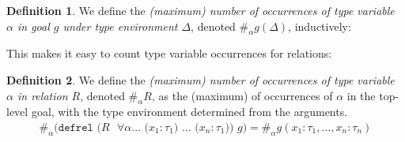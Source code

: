 \documentclass{report}
\theoremstyle{definition}
\newtheorem{definition}{Definition}
\begin{document}
\begin{definition}
	We define the \emph{(maximum) number of occurrences of type variable \(\alpha\) in goal \(g\) under type environment \(\Delta\)}, denoted \(\#_\alpha g(\Delta)\), inductively:
\end{definition}

This makes it easy to count type variable occurrences for relations:

\begin{definition}
	We define the \emph{(maximum) number of occurrences of type variable \(\alpha\) in relation \(R\)}, denoted \(\#_\alpha R\),
	as the (maximum) of occurrences of \(\alpha\) in the top-level goal, with the type environment determined from the arguments.
	\begin{align*}
		\#_\alpha \texttt{(defrel (\(R\) \(\forall \alpha \dots\) (\(x_1:\tau_1\)) \(\dots\) (\(x_n : \tau_1\))) \(g\))} = \#_\alpha g(x_1:\tau_1,\dots,x_n:\tau_n)
	\end{align*}
\end{definition}
\end{document}
